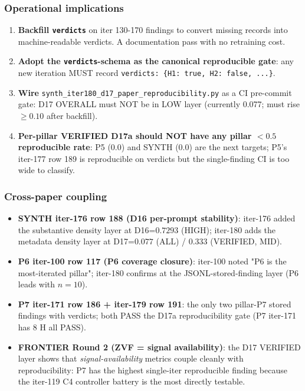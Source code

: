 \subsubsection{Operational implications}
\begin{enumerate}
\item \textbf{Backfill \texttt{verdicts}} on iter 130-170 findings to
  convert missing records into machine-readable verdicts. A
  documentation pass with no retraining cost.
\item \textbf{Adopt the \texttt{verdicts}-schema as the canonical
  reproducible gate}: any new iteration MUST record
  \texttt{verdicts: \{H1: true, H2: false, ...\}}.
\item \textbf{Wire} \texttt{synth\_iter180\_d17\_paper\_reproducibility.py}
  as a CI pre-commit gate: D17 OVERALL must NOT be in LOW layer
  (currently 0.077; must rise $\ge 0.10$ after backfill).
\item \textbf{Per-pillar VERIFIED D17a should NOT have any pillar
  $< 0.5$ reproducible rate}: P5 (0.0) and SYNTH (0.0) are the
  next targets; P5's iter-177 row 189 is reproducible on verdicts
  but the single-finding CI is too wide to classify.
\end{enumerate}

\subsubsection{Cross-paper coupling}
\begin{itemize}
\item \textbf{SYNTH iter-176 row 188 (D16 per-prompt stability)}:
  iter-176 added the substantive density layer at D16=$0.7293$
  (HIGH); iter-180 adds the metadata density layer at D17=$0.077$
  (ALL) / $0.333$ (VERIFIED, MID).
\item \textbf{P6 iter-100 row 117 (P6 coverage closure)}:
  iter-100 noted "P6 is the most-iterated pillar"; iter-180
  confirms at the JSONL-stored-finding layer (P6 leads with $n{=}10$).
\item \textbf{P7 iter-171 row 186 + iter-179 row 191}: the only
  two pillar-P7 stored findings with verdicts; both PASS the
  D17a reproducibility gate (P7 iter-171 has 8 H all PASS).
\item \textbf{FRONTIER Round 2 (ZVF = signal availability)}:
  the D17 VERIFIED layer shows that \emph{signal-availability}
  metrics couple cleanly with reproducibility: P7 has the highest
  single-iter reproducible finding because the iter-119 C4
  controller battery is the most directly testable.
\end{itemize}
